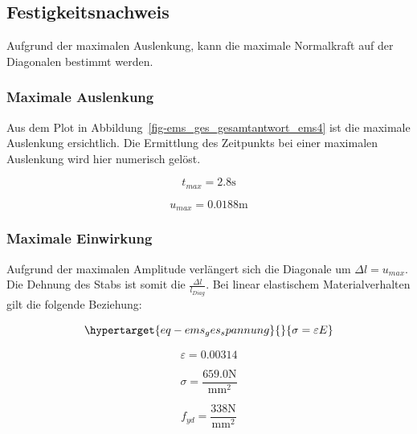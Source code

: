 \documentclass[
  letterpaper,
  DIV=11]{scrreprt}
\begin{document}
\hypertarget{festigkeitsnachweis}{%
\subsection{Festigkeitsnachweis}\label{festigkeitsnachweis}}

Aufgrund der maximalen Auslenkung, kann die maximale Normalkraft auf der
Diagonalen bestimmt werden.

\hypertarget{maximale-auslenkung}{%
\subsubsection{Maximale Auslenkung}\label{maximale-auslenkung}}

Aus dem Plot in Abbildung~\ref{fig-ems_ges_gesamtantwort_ems4} ist die
maximale Auslenkung ersichtlich. Die Ermittlung des Zeitpunkts bei einer
maximalen Auslenkung wird hier numerisch gelöst.

\begin{equation}t_{max} = 2.8 \text{s}\end{equation}

\begin{equation}u_{max} = 0.0188 \text{m}\end{equation}

\hypertarget{maximale-einwirkung}{%
\subsubsection{Maximale Einwirkung}\label{maximale-einwirkung}}

Aufgrund der maximalen Amplitude verlängert sich die Diagonale um
\(\Delta l = u_{max}\). Die Dehnung des Stabs ist somit die
\(\frac{\Delta l}{l_{Diag}}\). Bei linear elastischem Materialverhalten
gilt die folgende Beziehung:

\begin{equation}\protect\hypertarget{eq-ems_ges_spannung}{}{
\sigma = \varepsilon E
}\label{eq-ems_ges_spannung}\end{equation}

\begin{equation}\varepsilon = 0.00314\end{equation}

\begin{equation}\sigma = \frac{659.0 \text{N}}{\text{mm}^{2}}\end{equation}

\begin{equation}f_{yd} = \frac{338 \text{N}}{\text{mm}^{2}}\end{equation}
\end{document}
